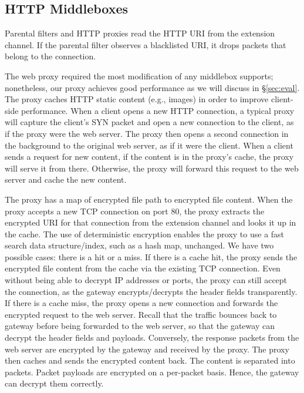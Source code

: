 \subsection{HTTP Middleboxes}
Parental filters and HTTP proxies read the HTTP URI from the extension channel. 
If the parental filter observes a blacklisted URI, it drops packets that belong to the connection.

The web proxy required the most modification of any middlebox \sys supports; nonetheless, our proxy achieves good performance as we will discuss in \S\ref{sec:eval}.
The proxy caches HTTP static content (e.g., images) in order to improve client-side performance. 
When a client opens a new HTTP connection, a typical proxy will capture the client's SYN packet and open a new connection to the client, as if the proxy were the web server. The proxy then opens a second connection in the background to the original web server, as if it were the client. 
When a client sends a request for new content, if the content is in the proxy's cache, the proxy will serve it from there. Otherwise, the proxy will forward this request to the web server and cache the new content. 

The proxy has a map of encrypted file path to encrypted file content. When the proxy accepts a new TCP connection on port 80, the proxy extracts the encrypted URI for that connection from the extension channel and looks it up in the cache. The use of deterministic encryption enables the proxy to use a fast search data structure/index, such as a hash map, unchanged. We have two possible cases: there is a hit or a miss. If there is a cache hit, the proxy sends the encrypted file content from the cache via the existing TCP connection. Even without being able to decrypt IP addresses or ports, the proxy can still accept the connection, as the gateway encrypts/decrypts the header fields transparently.
If there is a cache miss, the proxy opens a new connection and forwards the encrypted request to the web server. Recall that the traffic bounces back to gateway before being forwarded to the web server, so that the gateway can decrypt the header fields and payloads. Conversely, the response packets from the web server are encrypted by the gateway and received by the proxy. The proxy then caches and sends the encrypted content back. The content is separated into packets. Packet payloads are encrypted on a per-packet basis. Hence, the gateway can decrypt them correctly.


